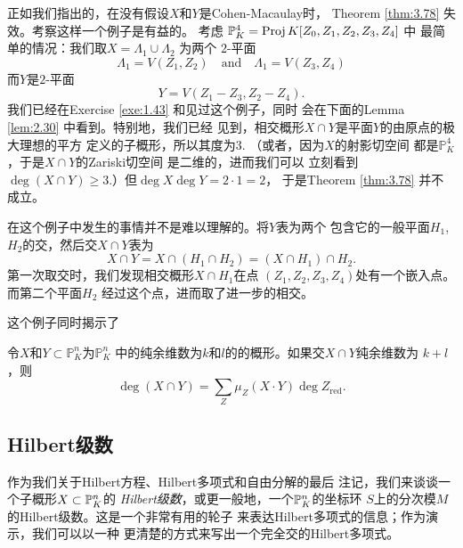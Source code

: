 
\begin{exa}\label{exa:3.79}
正如我们指出的，在没有假设$X$和$Y$是Cohen-Macaulay时，
Theorem \ref{thm:3.78} 失效。考察这样一个例子是有益的。
考虑 $\mathbb P_K^4=\proj K[Z_0,Z_1,Z_2,Z_3,Z_4]$ 中
最简单的情况：我们取$X=\Lambda_1\cup \Lambda_2$ 为两个
$2$-平面
\[
	\Lambda_1=V(Z_1,Z_2)\quad \text{and}\quad
	\Lambda_1=V(Z_3,Z_4)
\]
而$Y$是$2$-平面
\[
	Y=V(Z_1-Z_3,Z_2-Z_4).
\]
我们已经在Exercise \ref{exe:1.43} 和见过这个例子，同时
会在下面的Lemma \ref{lem:2.30} 中看到。特别地，我们已经
见到，相交概形$X\cap Y$是平面$Y$的由原点的极大理想的平方
定义的子概形，所以其度为$3$. （或者，因为$X$的射影切空间
都是$\mathbb P_K^4$ \nottran ，于是$X\cap Y$的Zariski切空间
是二维的，进而我们可以
立刻看到$\deg(X\cap Y)\geq 3$.）但$\deg X\deg Y=2\cdot 1=2$，
于是Theorem \ref{thm:3.78} 并不成立。
\end{exa}

在这个例子中发生的事情并不是难以理解的。将$Y$表为两个
包含它的一般平面$H_1$, $H_2$的交，然后交$X\cap Y$表为
\[
	X\cap Y=X\cap(H_1\cap H_2)=(X\cap H_1)\cap H_2.
\]
第一次取交时，我们发现相交概形$X\cap H_1$在点
$(Z_1,Z_2,Z_3,Z_4)$处有一个嵌入点。而第二个平面$H_2$
经过这个点，进而取了进一步的相交。

\vspace{1ex}

这个例子同时揭示了\nottran


\begin{thm}
\label{thm:3.80}
	令$X$和$Y\subset \mathbb P_K^n$为$\mathbb P_K^n$
	中的纯余维数为$k$和$l$的的概形。如果交$X\cap Y$纯余维数为
	$k+l$，则
	\[
		\deg(X\cap Y)=\sum_Z\mu_Z(X\cdot Y)\deg Z_{\text{red}}.
	\]
\end{thm}


\begin{exe}\label{exe:3.82}
	\nottran
\end{exe}

\subsection{Hilbert级数}\label{s:3.3.6}

作为我们关于Hilbert方程、Hilbert多项式和自由分解的最后
注记，我们来谈谈一个子概形$X\subset \P_K^n$的
\textit{Hilbert级数}，或更一般地，一个$\P_K^n$的坐标环
$S$上的分次模$M$的Hilbert级数。这是一个非常有用的轮子
来表达Hilbert多项式的信息；作为演示，我们可以以一种
更清楚的方式来写出一个完全交的Hilbert多项式。

